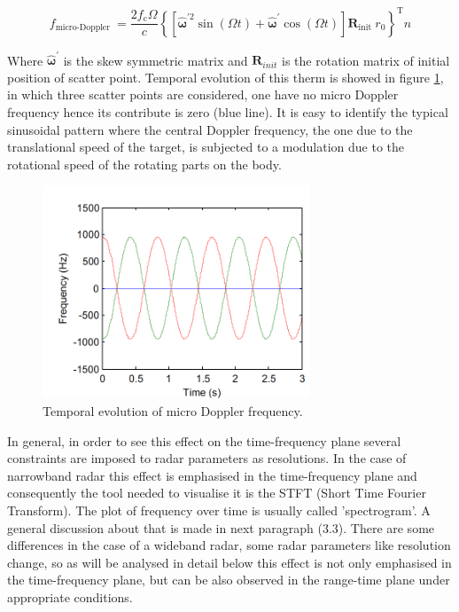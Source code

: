 \begin{equation}
f_{\text {micro-Doppler }}=\frac{2 f_{\mathrm{c}} \Omega}{c}\left\{\left[\widehat{\boldsymbol{\omega}}^{\prime 2} \sin (\Omega t)+\widehat{\boldsymbol{\omega}}^{\prime} \cos (\Omega t)\right] \mathbf{R}_{\text {init }} r_{0}\right\}^{\mathrm{T}} n
\end{equation}

Where $\widehat{\boldsymbol{\omega}}^{\prime}$ is the skew symmetric matrix and $ \mathbf{R}_{init }$ is the rotation matrix of initial position of scatter point. Temporal evolution of this therm is showed in figure \ref{mDevolution}, in which three scatter points are considered, one have no micro Doppler frequency hence its contribute is zero (blue line). It is easy to identify the typical sinusoidal pattern where the central Doppler frequency, the one due to the translational speed of the target, is subjected to a modulation due to the rotational speed of the rotating parts on the body.

\begin{figure}[h!]
    \centering
    \includegraphics[width=8cm]{Time-frequency analysis-chap3/img/mD effect.png}
    \caption{Temporal evolution of micro Doppler frequency.}
    \label{mDevolution}
\end{figure}

In general, in order to see this effect on the time-frequency plane several constraints are imposed to radar parameters as resolutions. In the case of narrowband radar this effect is emphasised in the time-frequency plane and consequently the tool needed to visualise it is the STFT (Short Time Fourier Transform).
The plot of frequency over time is usually called 'spectrogram'. A general discussion about that is made in next paragraph (3.3). 
There are some differences in the case of a wideband radar, some radar parameters like resolution change, so as will be analysed in detail below this effect is not only emphasised in the time-frequency plane, but can be also observed in the range-time plane under appropriate conditions.











